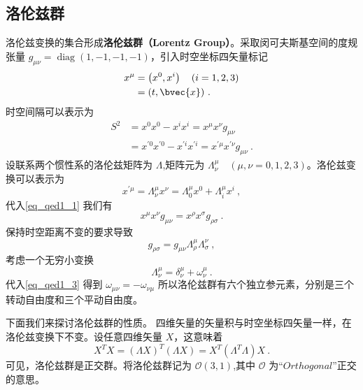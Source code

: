 \subsection{洛伦兹群}
洛伦兹变换的集合形成\textbf{洛伦兹群（Lorentz Group）}。采取闵可夫斯基空间的度规张量 $g_{\mu \nu}=\operatorname{diag}(1,-1,-1,-1)$，引入时空坐标四矢量标记
\begin{equation}
\begin{aligned}
x^{\mu} &=\left(x^{0}, x^{i}\right) \quad(i=1,2,3)\\
&=(t, \bvec{x})~.
\end{aligned}
\end{equation}
时空间隔可以表示为
\begin{equation}\label{eq_qed1_1}\begin{aligned}
S^{2} &=x^{0} x^{0}-x^{i} x^{i}=x^{\mu} x^{\nu} g_{\mu \nu} \\
&=x^{\prime 0} x^{\prime 0}-x^{\prime i} x^{\prime i}=x^{\prime \mu} x^{\prime \nu} g_{\mu \nu}~.
\end{aligned}\end{equation}
设联系两个惯性系的洛伦兹矩阵为 $\Lambda$,矩阵元为 $\Lambda_{\nu}^{\mu}\quad(\mu,\nu=0,1,2,3)$。洛伦兹变换可以表示为
\begin{equation}\label{eq_qed1_2}x^{\prime \mu}=\Lambda_{\nu}^{\mu} x^{\nu}=\Lambda_{0}^{\mu} x^{0}+\Lambda_{i}^{\mu} x^{i}~,\end{equation}
代入\autoref{eq_qed1_1} 我们有
\begin{equation}
x^{\mu} x^{\nu} g_{\mu \nu}=x^{\rho} x^{\sigma} g_{\rho \sigma}~.
\end{equation}
保持时空距离不变的要求导致
\begin{equation}\label{eq_qed1_3}g_{\rho \sigma}=g_{\mu \nu} \Lambda_{\rho}^{\mu} \Lambda_{\sigma}^{\nu}~,\end{equation}
考虑一个无穷小变换
\begin{equation}\Lambda_{\nu}^{\mu}=\delta_{\nu}^{\mu}+\omega_{\nu}^{\mu}~.\end{equation}
代入\autoref{eq_qed1_3} 得到 $\omega_{\mu \nu}=-\omega_{\nu \mu}$
所以洛伦兹群有六个独立参元素，分别是三个转动自由度和三个平动自由度。

下面我们来探讨洛伦兹群的性质。
四维矢量的矢量积与时空坐标四矢量一样，在洛伦兹变换下不变。设任意四维矢量 $X$，这意味着
\begin{equation}
X^TX=(\Lambda X)^T(\Lambda X)=X^T(\Lambda^T\Lambda)X~.
\end{equation}
可见，洛伦兹群是正交群。将洛伦兹群记为 $\mathcal{O}(3,1)$,其中 $\mathcal{O}$ 为“$Orthogonal$”正交的意思。

